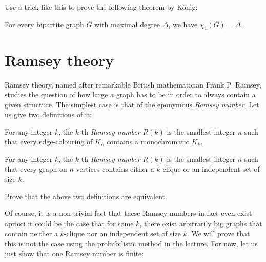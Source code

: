 \documentclass[nobib]{tufte-handout}
\begin{document}
\begin{xca}
    Use a trick like this to prove the following theorem by König:

    \begin{theorem}[König, 1916]
        For every bipartite graph $G$ with maximal degree $\Delta$, we have $\chi_1(G) = \Delta$.
    \end{theorem}
\end{xca}

\section{Ramsey theory}

Ramsey theory, named after remarkable British mathematician Frank P. Ramsey, studies the question of how large a graph has to be in order to always contain a given structure. The simplest case is that of the eponymous \emph{Ramsey number}. Let us give two definitions of it:

\begin{definition}
    For any integer $k$, the $k$-th \emph{Ramsey number} $R(k)$ is the smallest integer $n$ such that every edge-colouring of $K_n$ contains a monochromatic $K_k$.
\end{definition}

\begin{definition}
    For any integer $k$, the $k$-th \emph{Ramsey number} $R(k)$ is the smallest integer $n$ such that every graph on $n$ vertices contains either a $k$-clique or an independent set of size $k$.
\end{definition}

\begin{xca}
    Prove that the above two definitions are equivalent.
\end{xca}

Of course, it is a non-trivial fact that these Ramsey numbers in fact even exist -- apriori it could be the case that for some $k$, there exist arbitrarily big graphs that contain neither a $k$-clique nor an independent set of size $k$. We will prove that this is not the case using the probabilistic method in the lecture. For now, let us just show that one Ramsey number is finite:
\end{document}
